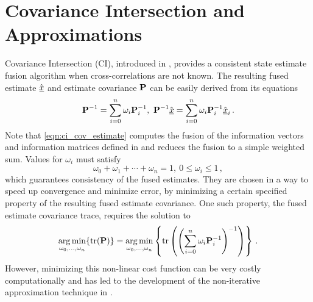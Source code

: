 \documentclass[letterpaper, 10 pt, conference]{ieeeconf}  %
\begin{document}
\section{Covariance Intersection and Approximations} \label{sec:ci}
Covariance Intersection (CI), introduced in \cite{julierNondivergentEstimationAlgorithm1997}, provides a consistent state estimate fusion algorithm when cross-correlations are not known. The resulting fused estimate $\hat{{\underline{x}}}$ and estimate covariance ${{\mathbf{P}}}$ can be easily derived from its equations
\begin{equation}
   {\ensuremath{{\mathbf{P}}}}^{-1}=\sum_{i=0}^{n}\omega_i {{\mathbf{P}}}_i^{-1},\ {{\mathbf{P}}}^{-1} \hat{{\underline{x}}} =\sum_{i=0}^{n}\omega_i {{\mathbf{P}}}_i^{-1} \hat{{\underline{x}}}_i\,. \label{eqn:ci_cov_estimate}
\end{equation}
Note that \eqref{eqn:ci_cov_estimate} computes the fusion of the information vectors and information matrices defined in \cite{niehsenInformationFusionBased2002} and reduces the fusion to a simple weighted sum.
Values for $\omega_i$ must satisfy
\begin{equation}
   \omega_0 + \omega_1 + \cdots + \omega_n = 1,\ 0 \leq \omega_i \leq 1\,, \label{eqn:ci_omega_sum_bound}
\end{equation}
which guarantees consistency of the fused estimates. They are chosen in a way to speed up convergence and minimize error, by minimizing a certain specified property of the resulting fused estimate covariance. One such property, the fused estimate covariance trace, requires the solution to
\begin{equation}
   \operatorname*{arg\,min}_{\omega_0,\dots,\omega_n} \{\operatorname{tr}({{\mathbf{P}}})\} = \operatorname*{arg\,min}_{\omega_0,\dots,\omega_n} \left\{\operatorname{tr}\left(\left(\sum_{i=0}^{n}\omega_i {{\mathbf{P}}}_i^{-1}\right)^{-1}\right)\right\}\,. \label{eqn:ci_trace_min}
\end{equation}
However, minimizing this non-linear cost function can be very costly computationally and has led to the development of the non-iterative approximation technique in \cite{niehsenInformationFusionBased2002}.
\end{document}
